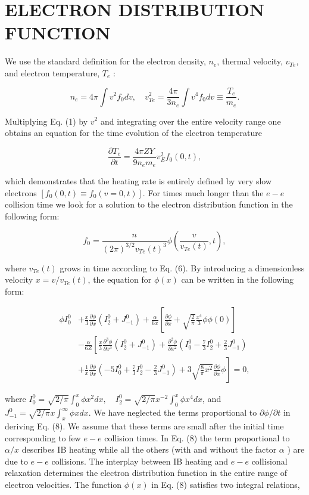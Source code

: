 \documentclass[10pt]{article}
\begin{document}
\section{ELECTRON DISTRIBUTION FUNCTION}
We use the standard definition for the electron density, $n_{e}$, thermal velocity, $v_{T e}$, and electron temperature, $T_{e}$ :

$$
n_{e}=4 \pi \int v^{2} f_{0} d v, \quad v_{T e}^{2}=\frac{4 \pi}{3 n_{e}} \int v^{4} f_{0} d v \equiv \frac{T_{e}}{m_{e}} .
$$

Multiplying Eq. (1) by $v^{2}$ and integrating over the entire velocity range one obtains an equation for the time evolution of the electron temperature

$$
\frac{\partial T_{e}}{\partial t}=\frac{4 \pi Z Y}{9 n_{e} m_{e}} v_{E}^{2} f_{0}(0, t),
$$

which demonstrates that the heating rate is entirely defined by very slow electrons $\left[f_{0}(0, t) \equiv f_{0}(v=0, t)\right]$. For times much longer than the $e-e$ collision time we look for a solution to the electron distribution function in the following form:

$$
f_{0}=\frac{n}{(2 \pi)^{3 / 2} v_{T e}(t)^{3}} \phi\left(\frac{v}{v_{T e}(t)}, t\right),
$$

where $v_{T e}(t)$ grows in time according to Eq. (6). By introducing a dimensionless velocity $x=v / v_{T e}(t)$, the equation for $\phi(x)$ can be written in the following form:

$$
\begin{aligned}
\phi I_{0}^{0} & +\frac{x}{3} \frac{\partial \phi}{\partial x}\left(I_{2}^{0}+J_{-1}^{0}\right)+\frac{\alpha}{6 x}\left[\frac{\partial \phi}{\partial x}+\sqrt{\frac{2}{\pi}} \frac{x^{4}}{3} \phi \phi(0)\right] \\
& -\frac{\alpha}{6 Z}\left[\frac{x}{3} \frac{\partial^{3} \phi}{\partial x^{3}}\left(I_{2}^{0}+J_{-1}^{0}\right)+\frac{\partial^{2} \phi}{\partial x^{2}}\left(I_{0}^{0}-\frac{7}{3} I_{2}^{0}+\frac{2}{3} J_{-1}^{0}\right)\right. \\
& \left.+\frac{1}{x} \frac{\partial \phi}{\partial x}\left(-5 I_{0}^{0}+\frac{7}{3} I_{2}^{0}-\frac{2}{3} J_{-1}^{0}\right)+3 \sqrt{\frac{8}{\pi} x^{2}} \frac{\partial \phi}{\partial x} \phi\right]=0,
\end{aligned}
$$

where $I_{0}^{0}=\sqrt{2 / \pi} \int_{0}^{x} \phi x^{2} d x, \quad I_{2}^{0}=\sqrt{2 / \pi} x^{-2} \int_{0}^{x} \phi x^{4} d x$, and $J_{-1}^{0}=\sqrt{2 / \pi} x \int_{x}^{\infty} \phi x d x$. We have neglected the terms proportional to $\partial \phi / \partial t$ in deriving Eq. (8). We assume that these terms are small after the initial time corresponding to few $e-e$ collision times. In Eq. (8) the term proportional to $\alpha / x$ describes IB heating while all the others (with and without the factor $\alpha$ ) are due to $e-e$ collisions. The interplay between IB heating and $e-e$ collisional relaxation determines the electron distribution function in the entire range of electron velocities. The function $\phi(x)$ in Eq. (8) satisfies two integral relations,
\end{document}
